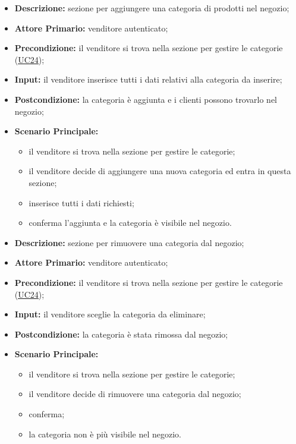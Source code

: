         \begin{itemize}
            \item \textbf{Descrizione:} sezione per aggiungere una categoria di prodotti nel negozio;
            \item \textbf{Attore Primario:} venditore autenticato;
            \item \textbf{Precondizione:} il venditore si trova nella sezione per gestire le categorie (\hyperref[sec:UC24]{\underline{UC24}});
            \item \textbf{Input:} il venditore inserisce tutti i dati relativi alla categoria da inserire;
            \item \textbf{Postcondizione:} la categoria è aggiunta e i clienti possono trovarlo nel negozio;
            \item \textbf{Scenario Principale:} 
                \begin{itemize}
                    \item il venditore si trova nella sezione per gestire le categorie;
                    \item il venditore decide di aggiungere una nuova categoria ed entra in questa sezione;
                    \item inserisce tutti i dati richiesti;
                    \item conferma l'aggiunta e la categoria è visibile nel negozio.
                \end{itemize}
        \end{itemize}
        \begin{itemize}
            \item \textbf{Descrizione:} sezione per rimuovere una categoria dal negozio;
            \item \textbf{Attore Primario:} venditore autenticato;
            \item \textbf{Precondizione:} il venditore si trova nella sezione per gestire le categorie (\hyperref[sec:UC24]{\underline{UC24}});
            \item \textbf{Input:} il venditore sceglie la categoria da eliminare;
            \item \textbf{Postcondizione:} la categoria è stata rimossa dal negozio;
            \item \textbf{Scenario Principale:} 
                \begin{itemize}
                    \item il venditore si trova nella sezione per gestire le categorie;
                    \item il venditore decide di rimuovere una categoria dal negozio;
                    \item conferma;
                    \item la categoria non è più visibile nel negozio.
                \end{itemize}
        \end{itemize}

